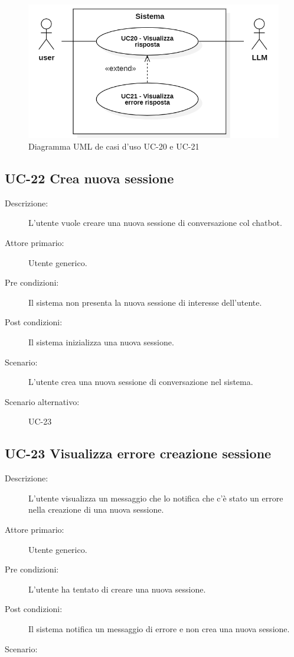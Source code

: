 \begin{figure}[H]
    \centering
    \includegraphics[width=0.8\linewidth]{UC20-21.PNG}
    \caption{Diagramma UML de casi d'uso UC-20 e UC-21}
    \label{fig:UC20-21}
\end{figure}

\subsection{UC-22 Crea nuova sessione}
\begin{description}
    \item[Descrizione:] L'utente vuole creare una nuova sessione di conversazione col chatbot.
    \item[Attore primario:] Utente generico.
    \item[Pre condizioni:] Il sistema non presenta la nuova sessione di interesse dell'utente.
    \item[Post condizioni:] Il sistema inizializza una nuova sessione.
    \item[Scenario:] L'utente crea una nuova sessione di conversazione nel sistema.
    \item[Scenario alternativo:] UC-23
\end{description}

\subsection{UC-23 Visualizza errore creazione sessione}
\begin{description}
    \item[Descrizione:] L'utente visualizza un messaggio che lo notifica che c'è stato un errore nella creazione di una nuova sessione.
    \item[Attore primario:] Utente generico.
    \item[Pre condizioni:] L'utente ha tentato di creare una nuova sessione.
    \item[Post condizioni:] Il sistema notifica un messaggio di errore e non crea una nuova sessione.
    \item[Scenario:] 
\end{description}

